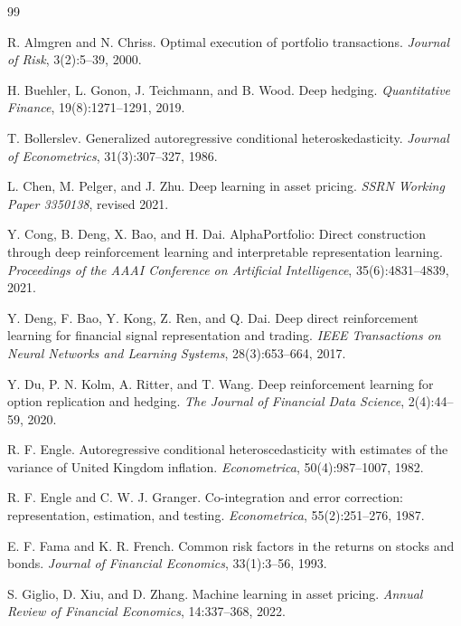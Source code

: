 \documentclass[11pt]{article}
\begin{document}
\begin{thebibliography}{99}

R. Almgren and N. Chriss.
\newblock Optimal execution of portfolio transactions.
\newblock \emph{Journal of Risk}, 3(2):5--39, 2000.

H. Buehler, L. Gonon, J. Teichmann, and B. Wood.
\newblock Deep hedging.
\newblock \emph{Quantitative Finance}, 19(8):1271--1291, 2019.

T. Bollerslev.
\newblock Generalized autoregressive conditional heteroskedasticity.
\newblock \emph{Journal of Econometrics}, 31(3):307--327, 1986.

L. Chen, M. Pelger, and J. Zhu.
\newblock Deep learning in asset pricing.
\newblock \emph{SSRN Working Paper 3350138}, revised 2021.

Y. Cong, B. Deng, X. Bao, and H. Dai.
\newblock AlphaPortfolio: Direct construction through deep reinforcement learning
  and interpretable representation learning.
\newblock \emph{Proceedings of the AAAI Conference on Artificial Intelligence},
  35(6):4831--4839, 2021.

Y. Deng, F. Bao, Y. Kong, Z. Ren, and Q. Dai.
\newblock Deep direct reinforcement learning for financial signal representation
  and trading.
\newblock \emph{IEEE Transactions on Neural Networks and Learning Systems},
  28(3):653--664, 2017.

Y. Du, P. N. Kolm, A. Ritter, and T. Wang.
\newblock Deep reinforcement learning for option replication and hedging.
\newblock \emph{The Journal of Financial Data Science}, 2(4):44--59, 2020.

R. F. Engle.
\newblock Autoregressive conditional heteroscedasticity with estimates of the
  variance of United Kingdom inflation.
\newblock \emph{Econometrica}, 50(4):987--1007, 1982.

R. F. Engle and C. W. J. Granger.
\newblock Co-integration and error correction: representation, estimation, and
  testing.
\newblock \emph{Econometrica}, 55(2):251--276, 1987.

E. F. Fama and K. R. French.
\newblock Common risk factors in the returns on stocks and bonds.
\newblock \emph{Journal of Financial Economics}, 33(1):3--56, 1993.

S. Giglio, D. Xiu, and D. Zhang.
\newblock Machine learning in asset pricing.
\newblock \emph{Annual Review of Financial Economics}, 14:337--368, 2022.


\end{thebibliography}
\end{document}
